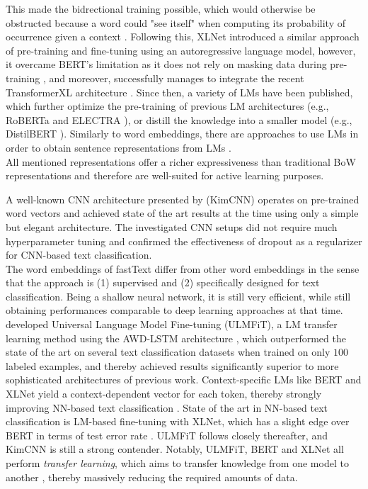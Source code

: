 This made the bidrectional training possible, which would otherwise be obstructed because a word could "see itself" when computing its probability of occurrence given a context .
Following this, XLNet  introduced a similar approach of pre-training and fine-tuning using an autoregressive language model, however, it overcame BERT's limitation as it does not rely on masking data during pre-training , and moreover, successfully manages to integrate the recent TransformerXL architecture .
Since then, a variety of LMs have been published, which further optimize the pre-training of previous LM architectures (e.g., RoBERTa  and ELECTRA ), or distill the knowledge into a smaller model (e.g., DistilBERT ).
Similarly to word embeddings, there are approaches to use LMs in order to obtain sentence representations from LMs .\\
\pindent All mentioned representations offer a richer expressiveness than traditional BoW representations and therefore are well-suited for active learning purposes.

\label{subsect:nn_text_classification}
A well-known CNN architecture presented by \textcite{kim2014convolutional} (KimCNN) operates on pre-trained word vectors and achieved state of the art results at the time using only a simple but elegant architecture.
The investigated CNN setups did not require much hyperparameter tuning and confirmed the effectiveness of dropout  as a regularizer for CNN-based text classification.\\
\pindent The word embeddings of fastText  differ from other word embeddings in the sense that the approach is (1) supervised and (2) specifically designed for text classification.
Being a shallow neural network, it is still very efficient, while still obtaining performances comparable to deep learning approaches at that time.\\
\pindent\textcite{howard2018universal} developed Universal Language Model Fine-tuning (ULMFiT), a LM transfer learning method using the AWD-LSTM architecture ,
which outperformed the state of the art on several text classification datasets when trained on only $100$ labeled examples, and thereby achieved results significantly superior to more sophisticated architectures of previous work.
Context-specific LMs like BERT  and XLNet  yield a context-dependent vector for each token, thereby strongly improving NN-based text classification .
State of the art in NN-based text classification is LM-based fine-tuning with XLNet, which has a slight edge over BERT in terms of test error rate .
ULMFiT follows closely thereafter, and KimCNN is still a strong contender.
Notably, ULMFiT, BERT and XLNet all perform {\em transfer learning}, which aims to transfer knowledge from one model to another ,
thereby massively reducing the required amounts of data.

